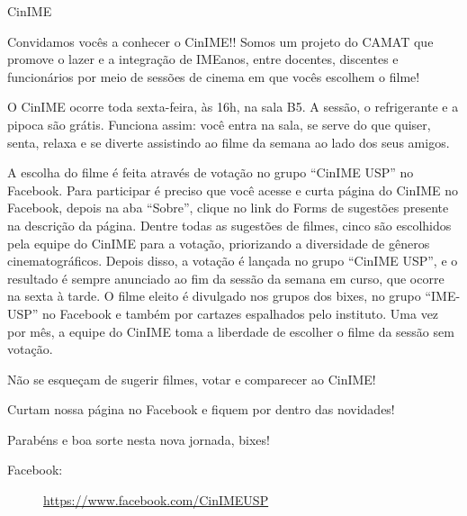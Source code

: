 \begin{subsecao}{CinIME}


Convidamos vocês a conhecer o CinIME!! Somos um projeto do CAMAT que promove o
lazer e a integração de IMEanos, entre docentes, discentes e funcionários por
meio de sessões de cinema em que vocês escolhem o filme!

O CinIME ocorre toda sexta-feira, às 16h, na sala B5. A sessão, o refrigerante
e a pipoca são grátis. Funciona assim: você entra na sala, se serve do que
quiser, senta, relaxa e se diverte assistindo ao filme da semana ao lado dos
seus amigos.

A escolha do filme é feita através de votação no grupo “CinIME USP” no
Facebook. Para participar é preciso que você acesse e curta página do CinIME no
Facebook, depois na aba “Sobre”, clique no link do Forms de sugestões presente 
na descrição da página. Dentre todas as sugestões de filmes, cinco são escolhidos 
pela equipe do CinIME para a votação, priorizando a diversidade de gêneros 
cinematográficos. Depois disso, a votação é lançada no grupo “CinIME USP”, e o 
resultado é sempre anunciado ao fim da sessão da semana em curso, que ocorre na 
sexta à tarde. O filme eleito é divulgado nos grupos dos bixes, no grupo
“IME-USP” no Facebook e também por cartazes espalhados pelo instituto. Uma vez 
por mês, a equipe do CinIME toma a liberdade de escolher o filme da sessão sem 
votação.

Não se esqueçam de sugerir filmes, votar e comparecer ao CinIME!

Curtam nossa página no Facebook e fiquem por dentro das novidades!

Parabéns e boa sorte nesta nova jornada, bixes!

\begin{description}
  \item[Facebook:] \url{https://www.facebook.com/CinIMEUSP}
\end{description}

\end{subsecao}

